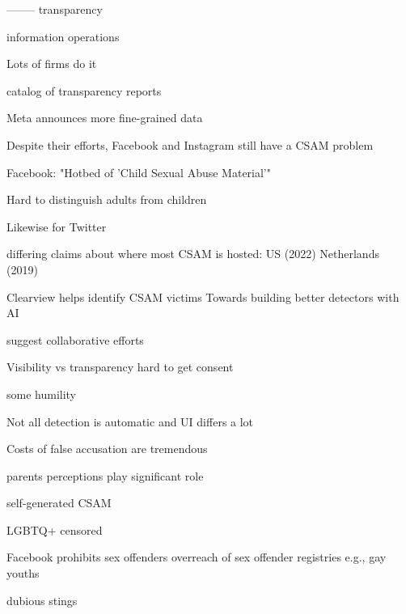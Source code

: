 \documentclass[nonacm,screen]{acmart}
\begin{document}
{-------- transparency

\cite{Francoisdouek2021}   information operations

Lots of firms do it \cite{AccessNow}


catalog of transparency reports \cite{StoughtonRosenzweig2022}


Meta announces more fine-grained data \cite{MetaTransparencyCenter}

Despite their efforts, Facebook and Instagram still have a CSAM problem
\cite{HorwitzBlunt2023,HorwitzBlunt2023a}

Facebook: "Hotbed of 'Child Sexual Abuse Material'" \cite{Hitt2021}

Hard to distinguish adults from children \cite{Keller2022}

Likewise for Twitter \cite{BrewsterLevine2022,DangPaul2022,KellerConger2023}



differing claims about where most CSAM is hosted: US \cite{Williams2022} (2022)
Netherlands \cite{Dance2019} (2019)



Clearview helps identify CSAM victims \cite{HillDance2020}
Towards building better detectors with AI \cite{LaranjeiraMacedoea2022}


suggest collaborative efforts \cite{Leerssen2020}


Visibility vs transparency \cite{StohlStohlea2016}
hard to get consent \cite{Obar2020}


some humility \cite{Keller2021}



Not all detection is automatic and UI differs a lot
\cite{CanadianCentreForChildProtection2020}



Costs of false accusation are tremendous \cite{Hill2022}

parents perceptions play significant role \cite{SetoRocheea2022}


self-generated CSAM \cite{Nottingham2022,ThielDiRestaea2023}

LGBTQ+ censored \cite{Prince2020,York2021}



Facebook prohibits sex offenders \cite{FacebookHelpCenter2012}
\cite{DePompa2019} overreach of sex offender registries
\cite{Bebernes2022,MellemaSethiea2014,Sethi2014}
e.g., gay youths \cite{Cramer2021}

dubious stings \cite{Winerip2020}


}
\end{document}
